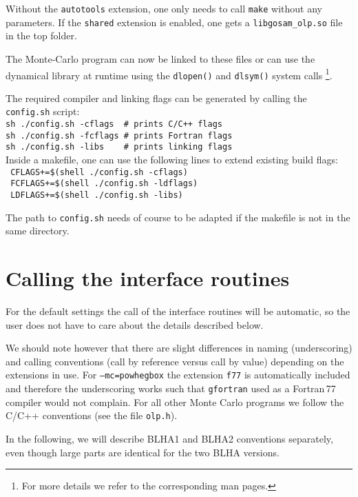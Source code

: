 Without the \texttt{autotools} extension, one only needs to call {\tt make} without
any parameters. If the \texttt{shared} extension is enabled, one gets a \texttt{libgosam\_olp.so} file
in the top folder.

The Monte-Carlo program can now be linked to these files or can
use the dynamical library at runtime using the \texttt{dlopen()} and \texttt{dlsym()} system calls%
\footnote{For more details we refer to the corresponding man pages.}.

The required compiler and linking flags can be generated by calling the \texttt{config.sh} script:\\
\texttt{sh ./config.sh -cflags\ \  \# prints C/C++ flags}\\
\texttt{sh ./config.sh -fcflags \# prints Fortran flags}\\
\texttt{sh ./config.sh -libs \ \ \  \# prints linking flags}\\

Inside a makefile, one can use the following lines to extend existing build flags:\\
\texttt{ CFLAGS+=\$(shell ./config.sh -cflags)}\\
\texttt{ FCFLAGS+=\$(shell ./config.sh -ldflags)} \\
\texttt{ LDFLAGS+=\$(shell ./config.sh -libs)}

The path to \texttt{config.sh} needs of course to be adapted if the makefile is not in the
same directory.

\section{Calling the interface routines}

For the default settings the call of the interface routines 
will be automatic, so the user does not have to care about the details described below.

We should note however that there are slight differences in naming (underscoring) and calling
conventions (call by reference versus call by value) depending on the
extensions in use. For \texttt{--mc=powhegbox} the extension \texttt{f77}
is automatically included and therefore the underscoring works such that
\texttt{gfortran} used as a Fortran\,77 compiler would not complain.
For all other Monte Carlo programs we follow the C/C++ conventions
(see the file \texttt{olp.h}).

In the following, we will describe BLHA1 and BLHA2 conventions separately, 
even though large parts are identical for the two BLHA versions.

